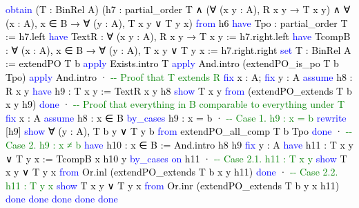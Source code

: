 \documentclass[
  letterpaper,
  DIV=11,
  numbers=noendperiod]{scrreprt}
\newenvironment{Shaded}{\begin{snugshade}}{\end{snugshade}}
\newcommand{\CommentTok}[1]{\textcolor[rgb]{0.37,0.37,0.37}{#1}}
\newcommand{\KeywordTok}[1]{\textcolor[rgb]{0.00,0.23,0.31}{#1}}
\newcommand{\NormalTok}[1]{\textcolor[rgb]{0.00,0.23,0.31}{#1}}
\renewcommand{\NormalTok}[1]{\textcolor[HTML]{000000}{#1}}
\renewcommand{\KeywordTok}[1]{\textcolor[HTML]{0000FF}{#1}}
\renewcommand{\CommentTok}[1]{\textcolor[HTML]{008000}{#1}}
\theoremstyle{remark}
\begin{document}
\begin{Shaded}
\begin{Highlighting}[]
    \KeywordTok{obtain}\NormalTok{ (T\textquotesingle{} : BinRel A)}
\NormalTok{      (h7 : partial\_order T\textquotesingle{} ∧ (∀ (x y : A), R x y → T\textquotesingle{} x y) ∧}
\NormalTok{      ∀ (x : A), x ∈ B\textquotesingle{} → ∀ (y : A), T\textquotesingle{} x y ∨ T\textquotesingle{} y x) }\KeywordTok{from}\NormalTok{ h6}
    \KeywordTok{have}\NormalTok{ T\textquotesingle{}po : partial\_order T\textquotesingle{} := h7.left}
    \KeywordTok{have}\NormalTok{ T\textquotesingle{}extR : ∀ (x y : A), R x y → T\textquotesingle{} x y := h7.right.left}
    \KeywordTok{have}\NormalTok{ T\textquotesingle{}compB\textquotesingle{} : ∀ (x : A), x ∈ B\textquotesingle{} →}
\NormalTok{      ∀ (y : A), T\textquotesingle{} x y ∨ T\textquotesingle{} y x := h7.right.right}
    \KeywordTok{set}\NormalTok{ T : BinRel A := extendPO T\textquotesingle{} b}
    \KeywordTok{apply}\NormalTok{ Exists.intro T}
    \KeywordTok{apply}\NormalTok{ And.intro (extendPO\_is\_po T\textquotesingle{} b T\textquotesingle{}po)}
    \KeywordTok{apply}\NormalTok{ And.intro}
\NormalTok{    · }\CommentTok{{-}{-} Proof that T extends R}
      \KeywordTok{fix}\NormalTok{ x : A; }\KeywordTok{fix}\NormalTok{ y : A}
      \KeywordTok{assume}\NormalTok{ h8 : R x y}
      \KeywordTok{have}\NormalTok{ h9 : T\textquotesingle{} x y := T\textquotesingle{}extR x y h8}
      \KeywordTok{show}\NormalTok{ T x y }\KeywordTok{from}\NormalTok{ (extendPO\_extends T\textquotesingle{} b x y h9)}
      \KeywordTok{done}
\NormalTok{    · }\CommentTok{{-}{-} Proof that everything in B comparable to everything under T}
      \KeywordTok{fix}\NormalTok{ x : A}
      \KeywordTok{assume}\NormalTok{ h8 : x ∈ B}
      \KeywordTok{by\_cases}\NormalTok{ h9 : x = b}
\NormalTok{      · }\CommentTok{{-}{-} Case 1. h9 : x = b}
        \KeywordTok{rewrite}\NormalTok{ [h9]}
        \KeywordTok{show}\NormalTok{ ∀ (y : A), T b y ∨ T y b }\KeywordTok{from}\NormalTok{ extendPO\_all\_comp T\textquotesingle{} b T\textquotesingle{}po}
        \KeywordTok{done}
\NormalTok{      · }\CommentTok{{-}{-} Case 2. h9 : x ≠ b}
        \KeywordTok{have}\NormalTok{ h10 : x ∈ B\textquotesingle{} := And.intro h8 h9}
        \KeywordTok{fix}\NormalTok{ y : A}
        \KeywordTok{have}\NormalTok{ h11 : T\textquotesingle{} x y ∨ T\textquotesingle{} y x := T\textquotesingle{}compB\textquotesingle{} x h10 y}
        \KeywordTok{by\_cases} \KeywordTok{on}\NormalTok{ h11}
\NormalTok{        · }\CommentTok{{-}{-} Case 2.1. h11 : T\textquotesingle{} x y}
          \KeywordTok{show}\NormalTok{ T x y ∨ T y x }\KeywordTok{from}
\NormalTok{            Or.inl (extendPO\_extends T\textquotesingle{} b x y h11)}
          \KeywordTok{done}
\NormalTok{        · }\CommentTok{{-}{-} Case 2.2. h11 : T\textquotesingle{} y x}
          \KeywordTok{show}\NormalTok{ T x y ∨ T y x }\KeywordTok{from}
\NormalTok{            Or.inr (extendPO\_extends T\textquotesingle{} b y x h11)}
          \KeywordTok{done}
        \KeywordTok{done}
      \KeywordTok{done}
    \KeywordTok{done}
  \KeywordTok{done}
\end{Highlighting}
\end{Shaded}
\end{document}
